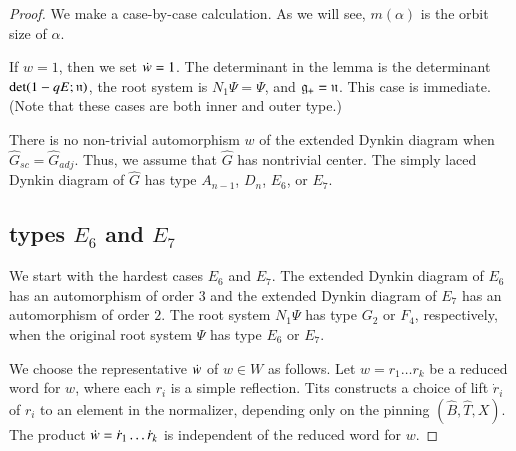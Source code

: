 \begin{proof} 
  We make a case-by-case calculation.  As we will see, $m(\alpha)$ is
  the orbit size of $\alpha$.

  If $w=1$, then we set $\dot w=1$.  The determinant in the lemma is
  the determinant $\det(1- q E;{\mathfrak n})$, the root system is $N_1\Psi
  =\Psi$, and ${\mathfrak g}_+ = {\mathfrak n}$.  This case is immediate.  (Note that these
  cases are both inner and outer type.)

  There is no non-trivial automorphism $w$ of the extended Dynkin
  diagram when $\hat G_{sc} = \hat G_{adj}$.  Thus, we assume that
  $\hat G$ has nontrivial center.  The simply laced Dynkin diagram of
  $\hat G$ has type $A_{n-1}$, $D_n$, $E_6$, or $E_7$.

\subsection{types $E_6$ and $E_7$}
  We start with the hardest cases $E_6$ and $E_7$.  The extended
  Dynkin diagram of $E_6$ has an automorphism of order $3$ and the
  extended Dynkin diagram of $E_7$ has an automorphism of order $2$.
  The root system $N_1\Psi$ has type $G_2$ or $F_4$, respectively,
  when the original root system $\Psi$ has type $E_6$ or $E_7$.

  We choose the representative $\dot w$ of $w\in W$ as follows.  Let
  $w=r_1\ldots r_k$ be a reduced word for $w$, where each $r_i$ is a
  simple reflection.  Tits constructs a choice of lift $\dot r_i$ of
  $r_i$ to an element in the normalizer, depending only on the pinning
  $(\hat B,\hat T,X)$.  The product $\dot w = \dot r_1\ldots \dot r_k$
  is independent of the reduced word for $w$.


\end{proof}
